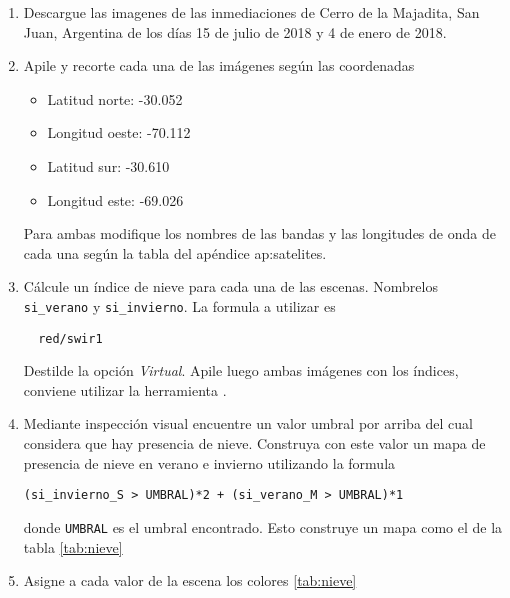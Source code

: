 \begin{enumerate}
\item Descargue las imagenes de las inmediaciones de Cerro de la Majadita, San Juan, Argentina de los días 15 de julio de 2018 y 4 de enero de 2018.

\item Apile y recorte cada una de las imágenes según las coordenadas

\begin{itemize}
    \item Latitud norte: -30.052
    \item Longitud oeste: -70.112
    \item Latitud sur: -30.610
    \item Longitud este: -69.026
\end{itemize}

Para ambas modifique los nombres de las bandas y las longitudes de onda de cada una según la tabla del apéndice ap:satelites.

\item Cálcule un índice de nieve para cada una de las escenas. Nombrelos \texttt{si\_verano} y \texttt{si\_invierno}. La formula a utilizar es

\begin{verbatim}
  red/swir1
\end{verbatim}

Destilde la opción \emph{Virtual}. Apile luego ambas imágenes con los índices, conviene utilizar la herramienta .

\item Mediante inspección visual encuentre un valor umbral por arriba del cual considera que hay presencia de nieve. Construya con este valor un mapa de presencia de nieve en verano e invierno utilizando la formula

\begin{verbatim}
(si_invierno_S > UMBRAL)*2 + (si_verano_M > UMBRAL)*1
\end{verbatim}

donde \texttt{UMBRAL} es el umbral encontrado. Esto construye un mapa como el de la tabla \ref{tab:nieve}

\item Asigne a cada valor de la escena los colores \ref{tab:nieve}


\end{enumerate}
